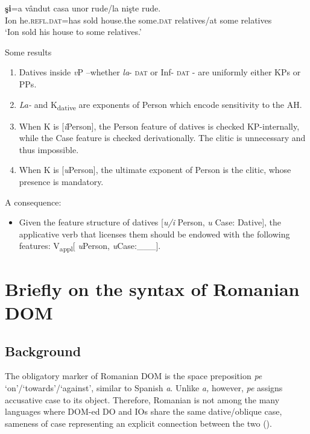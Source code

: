 \documentclass[output=paper,colorlinks,citecolor=brown,nonflat]{./langscibook}
\begin{document}
\ea%
      \label{ex:cornilescu:18}
       \textbf{{şi}}{=a} {vândut} {casa} {unor} rude/la {nişte} {rude}.\\
           Ion he.\textsc{refl}.\textsc{dat}=has sold house.the some.\textsc{dat} relatives/{at} some relatives \\
      \glt ‘Ion sold his house to some relatives.’
   \z


 {Some} {results}
\begin{enumerate}
	\item Datives inside \textit{v}P –whether \textit{la}{}- \textsc{dat} or Inf- \textsc{dat} - are uniformly either KPs or PPs.
	\item \textit{La-} and K\textsubscript{dative} are exponents of Person which encode sensitivity to the AH.
	\item When K is [\textit{i}Person], the Person feature of datives is checked KP-internally, while the Case feature is checked derivationally. The clitic is unnecessary and thus impossible.
	\item When K is [\textit{u}Person], the ultimate exponent of Person is the clitic, whose presence is mandatory.
\end{enumerate}

 A consequence: 
 \begin{itemize}
	\item Given the feature structure of datives [\textit{u/i} Person, \textit{u} Case: Dative], the applicative verb that licenses them should be endowed with the following features: V\textsubscript{appl}[ \textit{u}Person, \textit{u}Case:\_\_\_].
\end{itemize}

\section{Briefly on the syntax of Romanian DOM} %

\subsection{{Background}}

The obligatory marker of Romanian DOM is the space preposition \textit{pe} ‘on’/‘towards’/‘against’, similar to Spanish \textit{a}. Unlike \textit{a,} however, \textit{pe} assigns accusative case to its object. Therefore, Romanian is not among the many languages where DOM-ed DO and IOs share the same dative/oblique case, sameness of case representing an explicit connection between the two (\citealt{ManziniFranco2016}).
\end{document}
